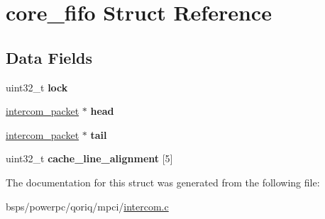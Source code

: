 \hypertarget{structcore__fifo}{}\section{core\+\_\+fifo Struct Reference}
\label{structcore__fifo}
\subsection*{Data Fields}
\begin{DoxyCompactItemize}
\item 
\mbox{\label{structcore__fifo_ae73d335399cd286ddbc807e280629d2e}} 
uint32\+\_\+t {\bfseries lock}
\item 
\mbox{\label{structcore__fifo_a381968d556a49a41ae06704e9073d137}} 
\mbox{\hyperlink{structintercom__packet}{intercom\+\_\+packet}} $\ast$ {\bfseries head}
\item 
\mbox{\label{structcore__fifo_a166674ad21161ce5d91db9708cc2552c}} 
\mbox{\hyperlink{structintercom__packet}{intercom\+\_\+packet}} $\ast$ {\bfseries tail}
\item 
\mbox{\label{structcore__fifo_ae3a53828cbe4280665907df95b0ba529}} 
uint32\+\_\+t {\bfseries cache\+\_\+line\+\_\+alignment} \mbox{[}5\mbox{]}
\end{DoxyCompactItemize}


The documentation for this struct was generated from the following file\+:\begin{DoxyCompactItemize}
\item 
bsps/powerpc/qoriq/mpci/\mbox{\hyperlink{intercom_8c}{intercom.\+c}}\end{DoxyCompactItemize}
